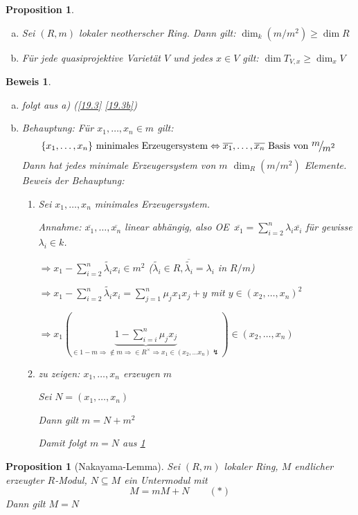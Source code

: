 \documentclass[a4paper, 12pt, numbers=noendperiod, chapterprefix=true]{scrbook}
\theoremstyle{break}
\newtheorem{Prop}[Def]{Proposition}
\theoremstyle{nonumberbreak}
\newtheorem{Bew}{Beweis}
\theoremstyle{nonumberplain}
\newcommand{\quot}[1]{\textrm{\glqq}{#1}\textrm{\grqq}}
\newcommand{\Sum}{\sum\limits}
\newenvironment{twosidedproof}{\begin{enumerate}[\quot{$\Rightarrow$}:]}{\end{enumerate}}
\newcommand{\proofforward}{\item[\quot{$\Rightarrow$}:]}
\newcommand{\proofreverse}{\item[\quot{$\Leftarrow$}:]}
\newcommand{\FakRaum}[2]{
  \raisebox{0.7ex}{\ensuremath{#1}}
  \ensuremath{\mkern-3mu}\big/\ensuremath{\mkern-3mu}
  \raisebox{-0.6ex}{\ensuremath{#2}}}
\renewcommand{\OE}{O\!\!E~}
\begin{document}
\begin{Prop}\label{19.4}\begin{enumerate}[a)]
\item
	Sei $(R,m)$ lokaler neotherscher Ring. Dann gilt: $\dim_k(m/m^2)\ge\dim R$
\item
	F\"ur jede quasiprojektive Variet\"at $V$ und jedes $x\in V$ gilt: $\dim T_{V,x}\ge\dim_xV$
\end{enumerate}\end{Prop}

\begin{Bew}\begin{enumerate}[a)]
\item[b)]
	folgt aus a) (\ref{19.3} \ref{19.3b})
\item[a)]
	\emph{Behauptung:} F\"ur $x_1,\ldots ,x_n\in m$ gilt:
		\[\{x_1,\ldots ,x_n\} \text{ minimales Erzeugersystem} \Leftrightarrow \overline{x_1},\ldots ,\overline{x_n} \text{ Basis von } \FakRaum{m}{m^2}\]
	Dann hat jedes minimale Erzeugersystem von $m$ $\dim_R(m/m^2)$ Elemente.\\
	\emph{Beweis der Behauptung:}\begin{twosidedproof}
	\proofforward
		Sei $x_1,\ldots ,x_n$ minimales Erzeugersystem.
		
		\emph{Annahme:} $\overline{x_1},\ldots ,\overline{x_n}$ linear abh\"angig, also \OE $\overline{x_1}=\Sum_{i=2}^n\lambda_i\overline{x_i}$ f\"ur gewisse $\lambda_i\in k$.
		
		$\Rightarrow x_1-\Sum_{i=2}^n\tilde{\lambda_i}x_i\in m^2$ ($\tilde{\lambda_i}\in R, \overline{\tilde{\lambda_i}}=\lambda_i$ in $R/m$)
		
		$\Rightarrow x_1-\Sum_{i=2}^n\tilde{\lambda_i}x_i = \Sum_{j=1}^n\mu_jx_1x_j+y$ mit $y\in(x_2,\ldots ,x_n)^2$
		
		$\Rightarrow x_1(\underbrace{1-\Sum_{i=i}^n\mu_jx_j}_{\in 1-m \Rightarrow \notin m \Rightarrow \in R^\times \Rightarrow x_1 \in (x_2,\ldots x_n) \lightning})\in (x_2,\ldots ,x_n)$
	\proofreverse
		\emph{zu zeigen:} $x_1,\ldots ,x_n$ erzeugen $m$
		
		Sei $N=(x_1,\ldots ,x_n)$
		
		Dann gilt $m=N+m^2$
		
		Damit folgt $m=N$ aus \ref{19.5}
	\end{twosidedproof}
\end{enumerate}\end{Bew}

\begin{Prop}[Nakayama-Lemma]\label{19.5}
Sei $(R,m)$ lokaler Ring, $M$ endlicher erzeugter $R$-Modul, $N\subseteq M$ ein Untermodul mit
	\[M=mM+N \qquad (*)\]
Dann gilt $M=N$
\end{Prop}
\end{document}
